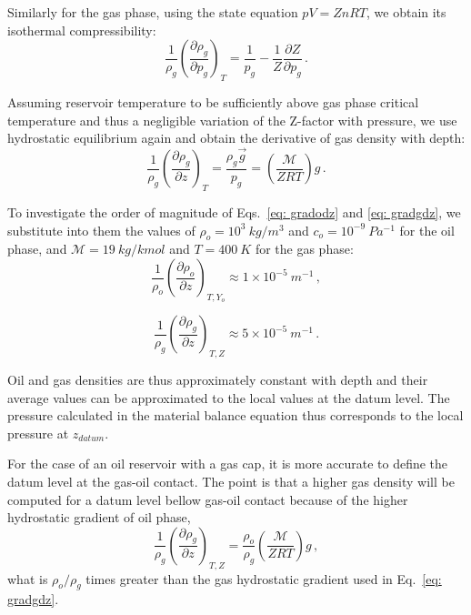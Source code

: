 \documentclass[authoryear,preprint,review,11pt]{elsarticle}
\begin{document}
Similarly for the gas phase, using the state equation $pV = Zn R T$, we obtain its isothermal compressibility:
\begin{equation}
\frac{1}{\rho_g}\left(\frac{\partial \rho_g}{\partial p_g}\right)_{T} = \frac{1}{p_g}-\frac{1}{Z}\frac{\partial Z}{\partial p_g} \, .
\end{equation}

Assuming reservoir temperature to be sufficiently above gas phase critical temperature and thus a negligible variation of the Z-factor with pressure, we use hydrostatic equilibrium again and obtain the derivative of gas density with depth:
\begin{equation}\label{eq: gradgdz}
\frac{1}{\rho_g}\left(\frac{\partial \rho_g}{\partial z}\right)_{T} = \frac{\rho_g \vec{g}}{p_g} = \left(\frac{\mathcal{M}}{ Z R T}\right) g \, .
\end{equation}

To investigate the order of magnitude of Eqs.~\eqref{eq: gradodz} and \eqref{eq: gradgdz}, we substitute into them the values of $\rho_o = 10^3\ kg/m^3$ and $c_o = 10^{-9}\ Pa^{-1}$ for the oil phase, and $\mathcal{M}=19\ kg/kmol$ and $T=400\ K$ for the gas phase: 
\begin{equation}
\frac{1}{\rho_o}\left(\frac{\partial \rho_o}{\partial z}\right)_{T,Y_o} \approx 1\times10^{-5}\ m^{-1} \, ,
\end{equation}

\begin{equation}
\frac{1}{\rho_g}\left(\frac{\partial \rho_g}{\partial z}\right)_{T,Z} \approx 5\times10^{-5}\ m^{-1} \, .
\end{equation}

Oil and gas densities are thus approximately constant with depth and their average values can be approximated to the local values at the datum level. The pressure calculated in the material balance equation thus corresponds to the local pressure at $z_{datum}$.


For the case of an oil reservoir with a gas cap, it is more accurate to define the datum level at the gas-oil contact. The point is that a higher gas density will be computed for a datum level bellow gas-oil contact because of the higher hydrostatic gradient of oil phase,
\begin{equation}
\frac{1}{\rho_g}\left(\frac{\partial \rho_g}{\partial z}\right)_{T,Z} = \frac{\rho_o}{\rho_g}\left(\frac{\mathcal{M}}{Z R T}\right)g  \, ,
\end{equation}
what is $\rho_o / \rho_g$ times greater than the gas hydrostatic gradient used in Eq.~\eqref{eq: gradgdz}.
\end{document}
